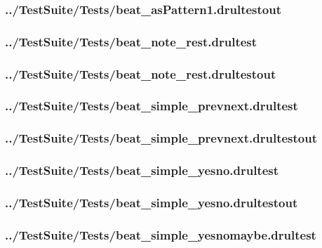 \begin{changemargin}{-1in}{-1in}
\subsubsection{../TestSuite/Tests/beat\_asPattern1.drultestout}


\subsubsection{../TestSuite/Tests/beat\_note\_rest.drultest}


\subsubsection{../TestSuite/Tests/beat\_note\_rest.drultestout}


\subsubsection{../TestSuite/Tests/beat\_simple\_prevnext.drultest}


\subsubsection{../TestSuite/Tests/beat\_simple\_prevnext.drultestout}


\subsubsection{../TestSuite/Tests/beat\_simple\_yesno.drultest}


\subsubsection{../TestSuite/Tests/beat\_simple\_yesno.drultestout}


\subsubsection{../TestSuite/Tests/beat\_simple\_yesnomaybe.drultest}



\end{changemargin}
